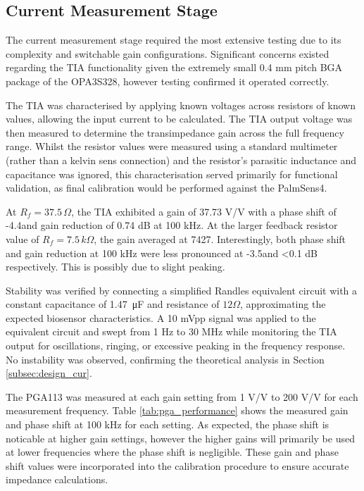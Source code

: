 

\subsection{Current Measurement Stage} 
The current measurement stage required the most extensive testing due to its complexity and switchable gain configurations. Significant concerns existed regarding the TIA functionality given the extremely small 0.4 mm pitch BGA package of the OPA3S328, however testing confirmed it operated correctly.

The TIA was characterised by applying known voltages across resistors of known values, allowing the input current to be calculated. The TIA output voltage was then measured to determine the transimpedance gain across the full frequency range. Whilst the resistor values were measured using a standard multimeter (rather than a kelvin sens connection) and the resistor's parasitic inductance and capacitance was ignored, this characterisation served primarily for functional validation, as final calibration would be performed against the PalmSens4. 

At $R_f = 37.5\,\Omega$, the TIA exhibited a gain of 37.73 V/V with a phase shift of -4.4\textdegree and gain reduction of 0.74 dB at 100 kHz. At the larger feedback resistor value of $R_f = 7.5\,k\Omega$, the gain averaged at 7427. Interestingly, both phase shift and gain reduction  at 100 kHz were less pronounced at -3.5\textdegree and \textless 0.1 dB respectively. This is possibly due to slight peaking.

Stability was verified by connecting a simplified Randles equivalent circuit with a constant capacitance of \SI{1.47}{\micro F} and resistance of $12 \Omega$, approximating the expected biosensor characteristics. A 10 mVpp signal was applied to the equivalent circuit and swept from 1 Hz to 30 MHz while monitoring the TIA output for oscillations, ringing, or excessive peaking in the frequency response. No instability was observed, confirming the theoretical analysis in Section \ref{subsec:design_cur}.

The PGA113 was measured at each gain setting from 1 V/V to 200 V/V for each measurement frequency. Table \ref{tab:pga_performance} shows the measured gain and phase shift at 100 kHz for each setting. As expected, the phase shift is noticable at higher gain settings, however the higher gains will primarily be used at lower frequencies where the phase shift is negligible. These gain and phase shift values were incorporated into the calibration procedure to ensure accurate impedance calculations.

